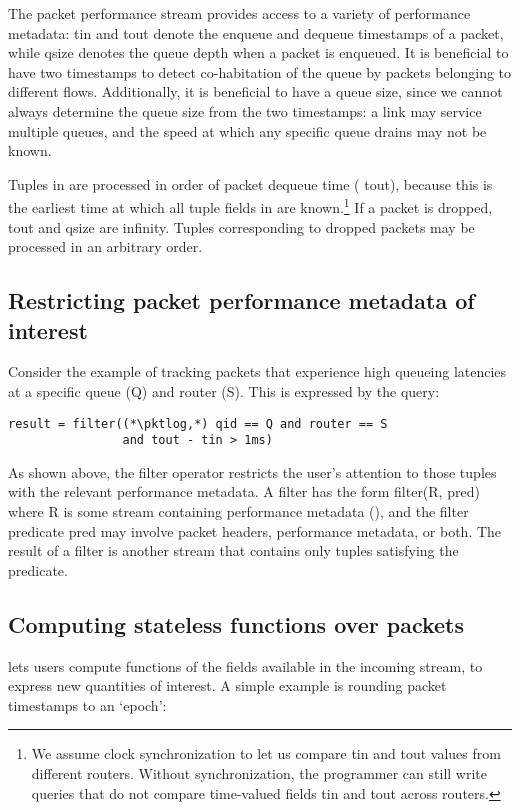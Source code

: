 The packet performance stream provides access to a variety of performance
metadata: {\ct tin} and {\ct tout} denote the enqueue and dequeue timestamps of
a packet, while {\ct qsize} denotes the queue depth when a packet is enqueued.
It is beneficial to have two timestamps to detect co-habitation of the queue by
packets belonging to different flows.  Additionally, it is beneficial to have a
queue size, since we cannot always determine the queue size from the two
timestamps: a link may service multiple queues, and the speed at which any
specific queue drains may not be known. 

Tuples in {\ct \pktlog} are processed in order of packet dequeue time ({\ct
tout}), because this is the earliest time at which all tuple fields in {\ct
\pktlog} are known.\footnote{We assume clock synchronization to let us compare
{\ctfoot tin} and {\ctfoot tout} values from different routers. Without
synchronization, the programmer can still write queries that do not compare
time-valued fields {\ctfoot tin} and {\ctfoot tout} across routers.} If a
packet is dropped, {\ct tout} and {\ct qsize} are {\ct infinity.} Tuples
corresponding to dropped packets may be processed in an arbitrary order.

\subsection{Restricting packet performance metadata of interest} Consider the
example of tracking packets that experience high queueing latencies at a
specific queue ({\ct Q}) and router ({\ct S}). This is expressed by the query:

\begin{lstlisting}
result = filter((*\pktlog,*) qid == Q and router == S
                and tout - tin > 1ms)
\end{lstlisting}

As shown above, the {\ct filter} operator restricts the user's attention to
those tuples with the relevant performance metadata. A filter has the form {\ct
filter(R, pred)} where {\ct R} is some stream containing performance metadata
(\eg {\ct \pktlog}), and the filter predicate {\ct pred} may involve packet
headers, performance metadata, or both. The result of a {\ct filter} is another
stream that contains only tuples satisfying the predicate.

\subsection{Computing stateless functions over packets} \TheSystem lets users
compute functions of the fields available in the incoming stream, to express
new quantities of interest. A simple example is rounding packet timestamps to
an `epoch':

